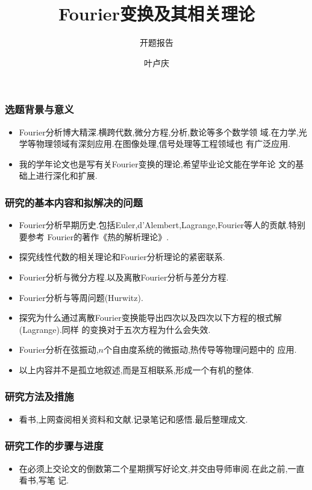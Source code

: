 \documentclass{beamer}
\begin{document}
\title{Fourier变换及其相关理论} \subtitle{开题报告}
\author{叶卢庆}
\begin{frame}
  \titlepage
\end{frame}
\begin{frame}
  \frametitle{选题背景与意义}
  \begin{itemize}
  \item Fourier分析博大精深.横跨代数,微分方程,分析,数论等多个数学领
    域.在力学,光学等物理领域有深刻应用.在图像处理,信号处理等工程领域也
    有广泛应用.\pause
  \item 我的学年论文也是写有关Fourier变换的理论,希望毕业论文能在学年论
    文的基础上进行深化和扩展.
  \end{itemize}
\end{frame}
\begin{frame}
  \frametitle{研究的基本内容和拟解决的问题}
  \begin{itemize}
\item Fourier分析早期历史.包括Euler,d'Alembert,Lagrange,Fourier等人的贡献.特别要参考
  Fourier的著作《热的解析理论》.\pause
\item 探究线性代数的相关理论和Fourier分析理论的紧密联系.\pause
\item Fourier分析与微分方程.以及离散Fourier分析与差分方程.\pause
\item Fourier分析与等周问题(Hurwitz).\pause
\item 探究为什么通过离散Fourier变换能导出四次以及四次以下方程的根式解(Lagrange).同样
  的变换对于五次方程为什么会失效.\pause
\item Fourier分析在弦振动,$n$个自由度系统的微振动,热传导等物理问题中的
  应用.\pause
\item 以上内容并不是孤立地叙述,而是互相联系,形成一个有机的整体.
  \end{itemize}
\end{frame}
\begin{frame}
  \frametitle{研究方法及措施}
\begin{itemize}
\item  看书,上网查阅相关资料和文献.记录笔记和感悟.最后整理成文.
\end{itemize}
\end{frame}
\begin{frame}
  \frametitle{研究工作的步骤与进度}
  \begin{itemize}
  \item 在必须上交论文的倒数第二个星期撰写好论文,并交由导师审阅.在此之前,一直看书,写笔
    记.
  \end{itemize}
\end{frame}
\end{document}
